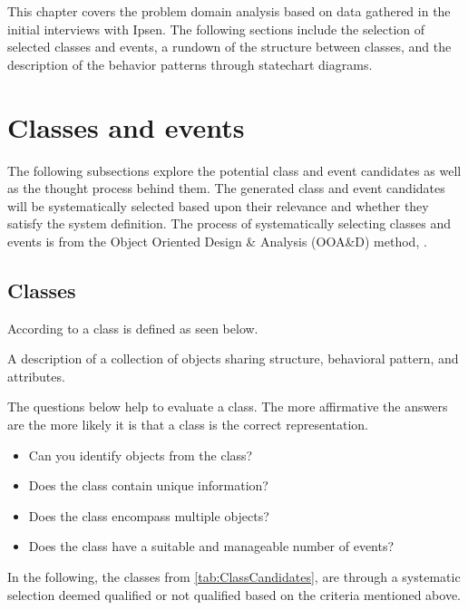 This chapter covers the problem domain analysis based on data gathered in the initial interviews with Ipsen.
The following sections include the selection of selected classes and events, a rundown of the structure between classes, and the description of the behavior patterns through statechart diagrams.

\section{Classes and events}\label{sec:ClassEvent}
The following subsections explore the potential class and event candidates as well as the thought process behind them.
The generated class and event candidates will be systematically selected based upon their relevance and whether they satisfy the system definition.
The process of systematically selecting classes and events is from the Object Oriented Design \& Analysis (OOA\&D) method, \cite{Rod-Aalborg}.

\subsection{Classes} \label{sec:Classes}
According to  \citep[p.~55]{Rod-Aalborg} a class is defined as seen below.
\begin{defn}\label{defn:class}
	A description of a collection of objects sharing structure, behavioral pattern, and attributes.
\end{defn}

The questions below help to evaluate a class. The more affirmative the answers are the more likely it is that a class is the correct representation. \citep[p.~62]{Rod-Aalborg}
\begin{itemize}
	\item Can you identify objects from the class?
	\item Does the class contain unique information?
	\item Does the class encompass multiple objects?
	\item Does the class have a suitable and manageable number of events?
\end{itemize}

In the following, the classes from \cref{tab:ClassCandidates}, are through a systematic selection deemed qualified or not qualified based on the criteria mentioned above.

